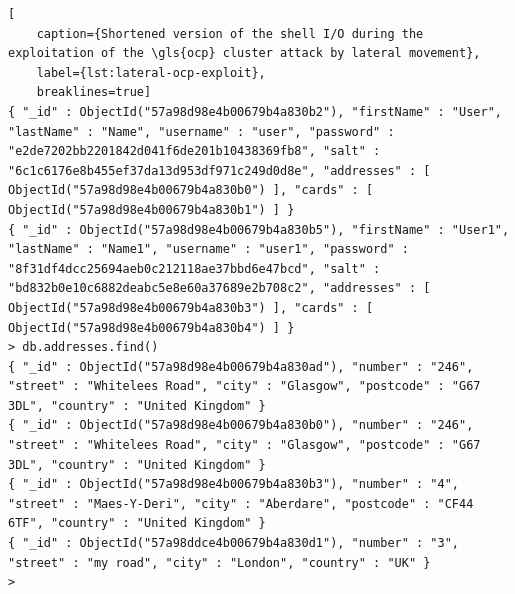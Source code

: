 \begin{lstlisting}[
	caption={Shortened version of the shell I/O during the exploitation of the \gls{ocp} cluster attack by lateral movement},
	label={lst:lateral-ocp-exploit},
	breaklines=true]
{ "_id" : ObjectId("57a98d98e4b00679b4a830b2"), "firstName" : "User", "lastName" : "Name", "username" : "user", "password" : "e2de7202bb2201842d041f6de201b10438369fb8", "salt" : "6c1c6176e8b455ef37da13d953df971c249d0d8e", "addresses" : [ ObjectId("57a98d98e4b00679b4a830b0") ], "cards" : [ ObjectId("57a98d98e4b00679b4a830b1") ] }
{ "_id" : ObjectId("57a98d98e4b00679b4a830b5"), "firstName" : "User1", "lastName" : "Name1", "username" : "user1", "password" : "8f31df4dcc25694aeb0c212118ae37bbd6e47bcd", "salt" : "bd832b0e10c6882deabc5e8e60a37689e2b708c2", "addresses" : [ ObjectId("57a98d98e4b00679b4a830b3") ], "cards" : [ ObjectId("57a98d98e4b00679b4a830b4") ] }
> db.addresses.find()
{ "_id" : ObjectId("57a98d98e4b00679b4a830ad"), "number" : "246", "street" : "Whitelees Road", "city" : "Glasgow", "postcode" : "G67 3DL", "country" : "United Kingdom" }
{ "_id" : ObjectId("57a98d98e4b00679b4a830b0"), "number" : "246", "street" : "Whitelees Road", "city" : "Glasgow", "postcode" : "G67 3DL", "country" : "United Kingdom" }
{ "_id" : ObjectId("57a98d98e4b00679b4a830b3"), "number" : "4", "street" : "Maes-Y-Deri", "city" : "Aberdare", "postcode" : "CF44 6TF", "country" : "United Kingdom" }
{ "_id" : ObjectId("57a98ddce4b00679b4a830d1"), "number" : "3", "street" : "my road", "city" : "London", "country" : "UK" }
>
\end{lstlisting}


